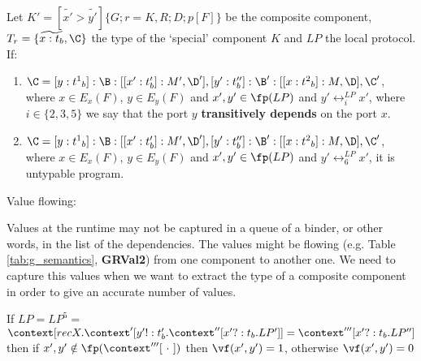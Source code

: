 \vspace{0.5cm}


Let $K'=[\tilde{x'}>\tilde{y'}]\{G;r=K,R;D;p[F]\}$ be the composite component, $T_r=\{\widetilde{x:t_b},\C\}$ the type of the `special' component $K$ and $LP$ the local protocol. \\
If:\\

\begin{enumerate}
    \item  $\C=[y:{t^1}_b]:\B:[[x':t_b']:M',\D'],[y':t_b'']:\B':[[x:{t^2}_b]:M,\D],\C'$, where $x\in E_x(F)$, $y\in E_y(F)$ and $x',y' \in \fp(LP)$ and $y'\rel^{LP}_i x'$, where $i\in \{2,3,5\}$ we say that the port $y$ \textbf{transitively depends} on the port $x$. 
    \item $\C=[y:{t^1}_b]:\B:[[x':t_b']:M',\D'],[y':t_b'']:\B':[[x:{t^2}_b]:M,\D],\C'$, where $x\in E_x(F)$, $y\in E_y(F)$ and $x',y' \in \fp(LP)$ and $y'\rel^{LP}_6 x'$, it is untypable program.
\end{enumerate}

\vspace{0.5cm}

Value flowing:


Values at the runtime may not be captured in a queue of a binder, or other words, in the list of the dependencies. The values might be flowing (e.g. Table \ref{tab:g_semantics}, \textbf{GRVal2}) from one component to another one. We need to capture this values when we want to extract the type of a composite component in order to give an accurate number of values.



If $LP=LP^5=$ $\context[recX.\context'[y'!:t_b'.\context''[x'?:t_b.LP']]=\context'''[x'?:t_b.LP'']$ then if $x',y'\notin \fp(\context'''[\ \cdot\ ])$  then $\vf(x',y')=1$, otherwise $\vf(x',y')=0$\\











